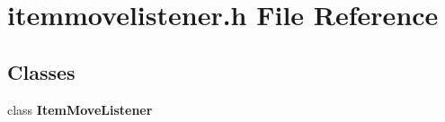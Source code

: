 \section{itemmovelistener.\+h File Reference}
\label{bk3_2items_2itemmovelistener_8h}
\subsection*{Classes}
\begin{DoxyCompactItemize}
\item 
class {\bf Item\+Move\+Listener}
\end{DoxyCompactItemize}
